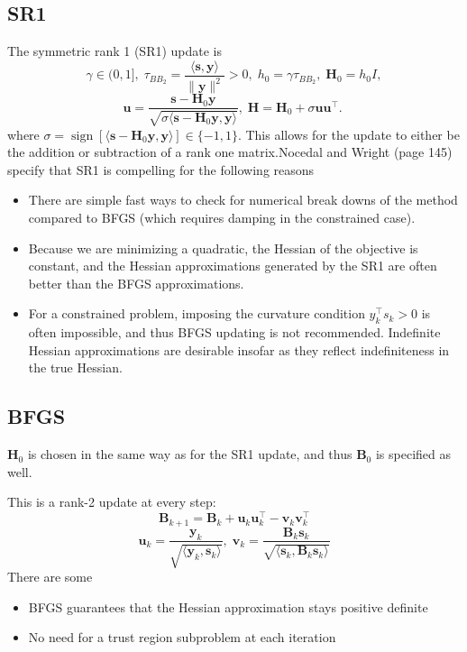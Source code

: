 \documentclass{article}
\renewcommand{\u}{\mathbf{u}}
\renewcommand{\v}{\mathbf{v}}
\newcommand{\s}{\mathbf{s}}
\newcommand{\y}{\mathbf{y}}
\renewcommand{\H}{\mathbf{H}}
\newcommand{\B}{\mathbf{B}}
\newcommand{\Hnaut}{\mathbf{H}_0}
\newcommand{\Bnaut}{\mathbf{B}_0}
\begin{document}
\subsection{SR1}
The symmetric rank 1 (SR1) update is 
\[\gamma \in (0,1], \; \tau_{BB_2} = \frac{\langle\s, \y\rangle}{\|\y\|^2} > 0, \; h_0 = \gamma \tau_{BB_2},\; \Hnaut = h_0 I, \]
\[\u = \frac{\s - \Hnaut \y}{ \sqrt{\sigma \langle \s - \Hnaut \y, \y\rangle}},\;\H = \Hnaut + \sigma \u \u^{\top}.\; \]
where $\sigma = \operatorname{sign}[\langle \s - \Hnaut \y, \y\rangle] \in \{-1,1\}$. This allows for the update to either be the addition or subtraction of a rank one matrix.Nocedal and Wright (page 145) specify that SR1 is compelling for the following reasons
\begin{itemize}
    \item There are simple fast ways to check for numerical break downs of the method compared to BFGS (which requires damping in the constrained case). 
    \item Because we are minimizing a quadratic, the Hessian of the objective is constant, and the Hessian approximations generated by the SR1 are often better than the BFGS approximations.
    \item For a constrained problem, imposing the curvature condition  $y_k^{\top} s_k>0$ is often impossible, and thus BFGS updating is not recommended. Indefinite Hessian approximations are desirable insofar as they reflect indefiniteness in the true Hessian.
\end{itemize}
\subsection{BFGS}
$\Hnaut$ is chosen in the same way as for the SR1 update, and thus $\Bnaut$ is specified as well. 

This is a rank-2 update at every step: 
\[\B_{k+1} = \B_k + \u_k\u^{\top}_k - \v_k\v^{\top}_k\]
\[\u_k = \frac{\y_k }{\sqrt{ \langle \y_k,\s_k\rangle}}, \;\v_k = \frac{\B_k \s_k }{\sqrt{ \langle \s_k, \B_k \s_k \rangle}}\]
There are some 
\begin{itemize}
    \item BFGS guarantees that the Hessian approximation stays positive definite
    \item No need for a trust region subproblem at each iteration
\end{itemize}
\end{document}
